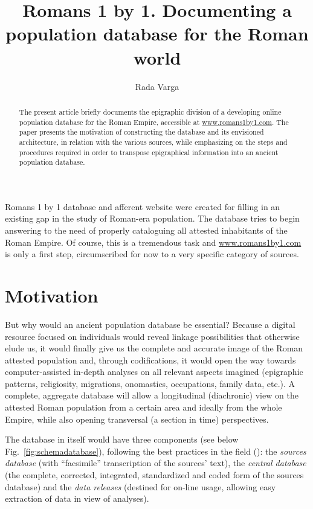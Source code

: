 \documentclass[amsthm,ebook]{saparticle}
\title{Romans 1 by 1. Documenting a population database for the Roman world}
\author[CLUJ]{Rada Varga\corref{first}}
\begin{document}
\maketitle

\begin{abstract}
 The present article briefly documents the epigraphic division of a developing online population database for the Roman
Empire, accessible at \url{www.romans1by1.com}. The paper presents the motivation of constructing the database and its
envisioned architecture, in relation with the various sources, while emphasizing on the steps and procedures required
in order to transpose epigraphical information into an ancient population database. 
\end{abstract}



\noindent Romans 1 by 1 database and afferent website were created for filling in an existing gap in the study of Roman-era
population. The database tries to begin answering to the need of properly cataloguing all attested inhabitants of the
Roman Empire. Of course, this is a tremendous task and \url{www.romans1by1.com} is only a first step, circumscribed for now
to a very specific category of sources.


\section{Motivation}


\noindent But why would an ancient population database be essential? Because a digital resource focused on individuals would
reveal linkage possibilities that otherwise elude us, it would finally give us the complete and accurate image of the
Roman attested population and, through codifications, it would open the way towards computer-assisted in-depth analyses
on all relevant aspects imagined (epigraphic patterns, religiosity, migrations, onomastics, occupations, family data,
etc.). A complete, aggregate database will allow a longitudinal (diachronic) view on the attested Roman population from
a certain area and ideally from the whole Empire, while also opening transversal (a section in time) perspectives.

The database in itself would have three components (see below Fig.~\ref{fig:schemadatabase}), following the best practices in the field
(\citet{doi:10.3200/HMTS.37.1.34-38}): the \emph{sources database} (with ``facsimile'' transcription of the sources’ text), the \emph{central database} (the complete, corrected, integrated, standardized and coded form of the sources database) and the \emph{data releases} (destined for on-line usage, allowing easy extraction of data in view of analyses). 
\end{document}
